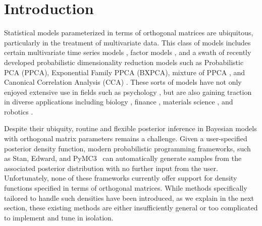 \documentclass[ba]{imsart}
\numberwithin{equation}{section}
\theoremstyle{plain}
\begin{document}
\section{Introduction}
Statistical models parameterized in terms of orthogonal matrices are ubiquitous, particularly in the treatment of multivariate data. This class of models includes certain multivariate time series models \citep{brockwell2002introduction}, factor models \citep{johnson2004multivariate}, and a swath of recently developed probabilistic dimensionality reduction models such as Probabilistic PCA (PPCA),  Exponential Family PPCA (BXPCA), mixture of PPCA \citep{ghahramani1996algorithm}, and Canonical Correlation Analysis (CCA) \citep[Chapt.~12.5]{murphy2012machine}. These sorts of models have not only enjoyed extensive use in fields such as psychology \citep{ford1986application}, but are also gaining traction in diverse applications including biology \citep{hamelryck2006sampling}, finance \citep{lee2007bayesian}, materials science \citep{oh20172d}, and robotics \citep{lu1997robot}.

\noindent Despite their ubiquity, routine and flexible posterior inference in Bayesian models with orthogonal matrix parameters remains a challenge. Given a user-specified posterior density function, modern probabilistic programming frameworks, such as Stan, Edward, and PyMC3~\citep{carpenter2016stan,tran2016edward,salvatier2016probabilistic} can automatically generate samples from the associated posterior distribution with no further input from the user. Unfortunately, none of these frameworks currently offer support for density functions specified in terms of orthogonal matrices. While methods specifically tailored to handle such densities have been introduced, as we explain in the next section, these existing methods are either insufficiently general or too complicated to implement and tune in isolation.
\end{document}
